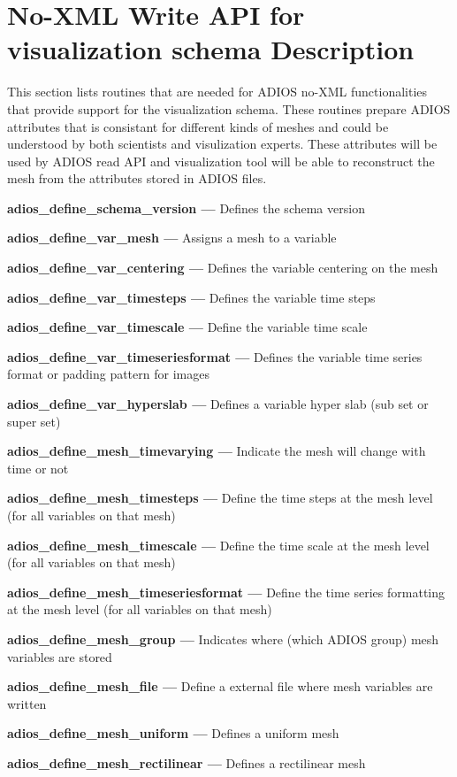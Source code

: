 \section{No-XML Write API for visualization schema Description}
This section lists routines that are needed for ADIOS no-XML functionalities
that provide support for the visualization schema. These routines prepare ADIOS
attributes that is consistant for different kinds of meshes and could be
understood by both scientists and visulization experts. These attributes will
be used by ADIOS read API and visualization tool will be able to reconstruct the
mesh from the attributes stored in ADIOS files.

\textbf{adios\_define\_schema\_version ---} Defines the schema version

\textbf{adios\_define\_var\_mesh ---} Assigns a mesh to a variable

\textbf{adios\_define\_var\_centering ---} Defines the variable centering on the mesh

\textbf{adios\_define\_var\_timesteps ---} Defines the variable time steps

\textbf{adios\_define\_var\_timescale ---} Define the variable time scale

\textbf{adios\_define\_var\_timeseriesformat ---} Defines the variable time series format or padding pattern for images

\textbf{adios\_define\_var\_hyperslab ---} Defines a variable hyper slab (sub set or super set)

\textbf{adios\_define\_mesh\_timevarying ---} Indicate the mesh will change with time or not

\textbf{adios\_define\_mesh\_timesteps ---} Define the time steps at the mesh level (for all variables on that mesh)

\textbf{adios\_define\_mesh\_timescale ---} Define the time scale at the mesh level (for all variables on that mesh)

\textbf{adios\_define\_mesh\_timeseriesformat ---} Define the time series formatting at the mesh level (for all variables on that mesh)

\textbf{adios\_define\_mesh\_group ---} Indicates where (which ADIOS group) mesh variables are stored

\textbf{adios\_define\_mesh\_file ---} Define a external file where mesh variables are written

\textbf{adios\_define\_mesh\_uniform ---} Defines a uniform mesh

\textbf{adios\_define\_mesh\_rectilinear ---} Defines a rectilinear mesh

